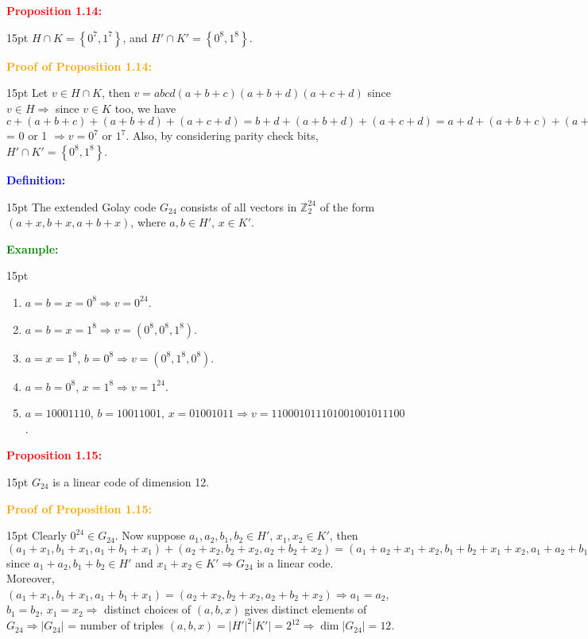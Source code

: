\documentclass[12pt]{article}
\newcommand{\noparskip}{\vspace{-\parskip}}
\newenvironment{points}
	{\begin{enumerate}[label = (\arabic*)]}
	{\end{enumerate}}
\newenvironment{dent}
	{\begin{adjustwidth}{15pt}{}\noparskip}
	{\end{adjustwidth}}
\newenvironment{result}[1]
	{\textcolor{Red}{\textbf{#1:}}\begin{dent}}
	{\end{dent}}
\newenvironment{proof}[1]
	{\textcolor{Orange}{\textbf{Proof of #1:}}\begin{dent}}
	{\end{dent}}
\newenvironment{definition}
	{\textcolor{Blue}{\textbf{Definition:}}\begin{dent}}
	{\end{dent}}
\newenvironment{example}
	{\textcolor{Green}{\textbf{Example:}}\begin{dent}}
	{\end{dent}}
\renewcommand{\implies}{\Rightarrow}
\newcommand{\set}[1]{\left\{ #1 \right\}}
\newcommand{\sizeof}[1]{\left| #1 \right|}
\newcommand{\Z}{\mathbb{Z}}
\begin{document}
\begin{result}{Proposition 1.14}
$H \cap K = \set{0^7, 1^7}$, and $H' \cap K' = \set{0^8, 1^8}$.
\end{result}

\begin{proof}{Proposition 1.14}
Let $v \in H \cap K$, then $v = abcd(a + b + c)(a + b + d)(a + c + d)$ since $v \in H \implies$ since $v \in K$ too, we have $c + (a + b + c) + (a + b + d) + (a + c + d) = b + d + (a + b + d) + (a + c + d) = a + d + (a + b + c) + (a + c + d) = 0 \implies a + c = c + d = a + b = 0 \implies a = b = c = d$ = 0 or 1 $\implies v = 0^7$ or $1^7$. Also, by considering parity check bits, $H' \cap K' = \set{0^8, 1^8}$.
\end{proof}

\begin{definition}
The extended Golay code $G_{24}$ consists of all vectors in $\Z_2^{24}$ of the form $(a + x, b + x, a + b + x)$, where $a, b \in H'$, $x \in K'$.
\end{definition}

\begin{example}
\begin{points}
\item $a = b = x = 0^8 \implies v = 0^{24}$.
\item $a = b = x = 1^8 \implies v = (0^8, 0^8, 1^8)$.
\item $a = x = 1^8$, $b = 0^8 \implies v = (0^8, 1^8, 0^8)$.
\item $a = b = 0^8$, $x = 1^8 \implies v = 1^{24}$.
\item $a = 10001110$, $b = 10011001$, $x = 01001011 \implies v = 110001011101001001011100$.
\end{points}
\end{example}

\begin{result}{Proposition 1.15}
$G_{24}$ is a linear code of dimension 12.
\end{result}

\begin{proof}{Proposition 1.15}
Clearly $0^{24} \in G_{24}$. Now suppose $a_1, a_2, b_1, b_2 \in H'$, $x_1, x_2 \in K'$, then $(a_1 + x_1, b_1 + x_1, a_1 + b_1 + x_1) + (a_2 + x_2, b_2 + x_2, a_2 + b_2 + x_2) = (a_1 + a_2 + x_1 + x_2, b_1 + b_2 + x_1 + x_2, a_1 + a_2 + b_1 + b_2 + x_1 + x_2) \in G_{24}$ since $a_1 + a_2, b_1 + b_2 \in H'$ and $x_1 + x_2 \in K' \implies G_{24}$ is a linear code. \\
Moreover, $(a_1 + x_1, b_1 + x_1, a_1 + b_1 + x_1) = (a_2 + x_2, b_2 + x_2, a_2 + b_2 + x_2) \implies a_1 = a_2$, $b_1 = b_2$, $x_1 = x_2 \implies$ distinct choices of $(a, b, x)$ gives distinct elements of $G_{24} \implies \sizeof{G_{24}}$ = number of triples $(a, b, x) = \sizeof{H'}^2 \sizeof{K'} = 2^{12} \implies \dim \sizeof{G_{24}} = 12$.
\end{proof}
\end{document}
